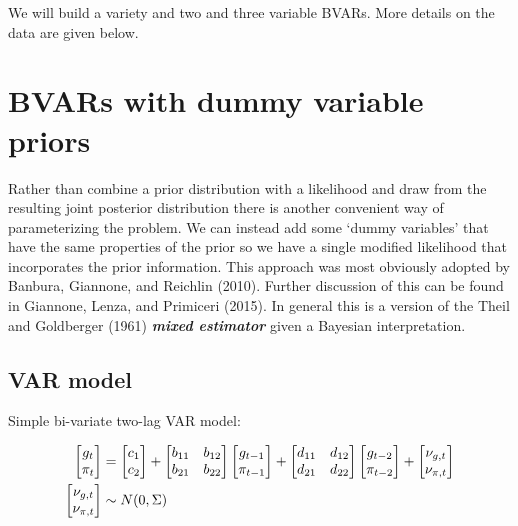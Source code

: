 \documentclass[
  letterpaper,
]{book}
\begin{document}
We will build a variety and two and three variable BVARs. More details
on the data are given below.

\hypertarget{bvars-with-dummy-variable-priors}{%
\section{BVARs with dummy variable
priors}\label{bvars-with-dummy-variable-priors}}

Rather than combine a prior distribution with a likelihood and draw from
the resulting joint posterior distribution there is another convenient
way of parameterizing the problem. We can instead add some `dummy
variables' that have the same properties of the prior so we have a
single modified likelihood that incorporates the prior information. This
approach was most obviously adopted by Banbura, Giannone, and Reichlin
(2010). Further discussion of this can be found in Giannone, Lenza, and
Primiceri (2015). In general this is a version of the Theil and
Goldberger (1961) \textbf{\emph{mixed estimator}} given a Bayesian
interpretation.

\hypertarget{var-model}{%
\subsection{VAR model}\label{var-model}}

Simple bi-variate two-lag VAR model:

\begin{align}
  \left[\begin{matrix}g_t \cr \pi_t\end{matrix}\right] &=
  \left[\begin{matrix}c_1 \cr c_2\end{matrix}\right] +
  \left[\begin{matrix}b_{11} & b_{12} \cr
    b_{21} & b_{22}\end{matrix}\right]
\left[\begin{matrix}g_{t-1} \cr \pi_{t-1} \end{matrix}\right] +
   \left[\begin{matrix}d_{11} & d_{12} \cr
    d_{21} & d_{22}\end{matrix}\right]
\left[\begin{matrix}g_{t-2} \cr \pi_{t-2} \end{matrix}\right] +
  \left[\begin{matrix}\nu_{g,t} \cr \nu_{\pi,t}\end{matrix}\right] \\
  \left[\begin{matrix}\nu_{g,t} \cr \nu_{\pi,t}\end{matrix}\right] &\sim N(0, \Sigma)
\end{align}
\end{document}
